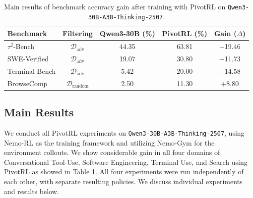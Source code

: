 \begin{table}[!t]
\centering
\small %
\begin{tabular}{lcccc}
\toprule
\textbf{Benchmark} & Filtering & \textbf{Qwen3-30B (\%)} & \textbf{PivotRL (\%)} & \textbf{Gain ($\Delta$)} \\ 
\midrule
$\tau^2$-Bench             & $\mathcal{D}_{\text{adv}}$    & 44.35 & 63.81 & +19.46 \\
SWE-Verified               & $\mathcal{D}_{\text{adv}}$  & 19.07 & 30.80 & +11.73 \\
Terminal-Bench             & $\mathcal{D}_{\text{adv}}$  & 5.42  & 20.00 & +14.58 \\ 
BrowseComp                 & $\mathcal{D}_{\text{random}}$ & 2.50  & 11.30 & +8.80  \\
\bottomrule
\end{tabular}
\caption{Main results of benchmark accuracy gain after training with PivotRL on \texttt{Qwen3-30B-A3B-Thinking-2507}.}
\label{tab:main_results_enhanced}
\end{table}

\subsection{Main Results}
We conduct all PivotRL experiments on \texttt{Qwen3-30B-A3B-Thinking-2507}, using Nemo-RL \citep{nemo-rl} as the training framework and utilizing Nemo-Gym \citep{nemo-gym} for the environment rollouts. We show considerable gain in all four domains of Conversational Tool-Use, Software Engineering, Terminal Use, and Search using PivotRL as showed in Table \ref{tab:main_results_enhanced}. All four experiments were run independently of each other, with separate resulting policies. We discuss individual experiments and results below.

